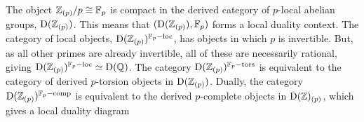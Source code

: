 \begin{example}
    The object $\mathbb{Z}_{(p)}/p \cong \mathbb{F}_p$ is compact in the derived category of $p$-local abelian groups, $\mathrm{D}(\mathbb{Z}_{(p)})$. This means that $(\mathrm{D}(\mathbb{Z}_{(p)}), \mathbb{F}_p)$ forms a local duality context. The category of local objects, $\mathrm{D}(\mathbb{Z}_{(p)})^{\mathbb{F}_p-\mathrm{loc}}$, has objects in which $p$ is invertible. But, as all other primes are already invertible, all of these are necessarily rational, giving $\mathrm{D}(\mathbb{Z}_{(p)})^{\mathbb{F}_p-\mathrm{loc}} \simeq \mathrm{D}(\mathbb{Q})$. The category $\mathrm{D}(\mathbb{Z}_{(p)})^{\mathbb{F}_p-\mathrm{tors}}$ is equivalent to the category of derived $p$-torsion objects in $\mathrm{D}(\mathbb{Z}_{(p)})$. Dually, the category $\mathrm{D}(\mathbb{Z}_{(p)})^{\mathbb{F}_p-\mathrm{comp}}$ is equivalent to the derived $p$-complete objects in $\mathrm{D}(\mathbb{Z})_{(p)}$, which gives a local duality diagram 
    \begin{center}
    \end{center}
\end{example}






































































